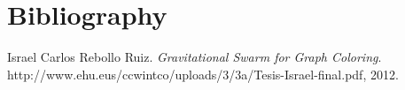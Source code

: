 \chapter{Bibliography}
\begin{thebibliography}{}

Israel Carlos Rebollo Ruiz. 
\textit{Gravitational Swarm for Graph Coloring}. 
http://www.ehu.eus/ccwintco/uploads/3/3a/Tesis-Israel-final.pdf, 2012.

\end{thebibliography}